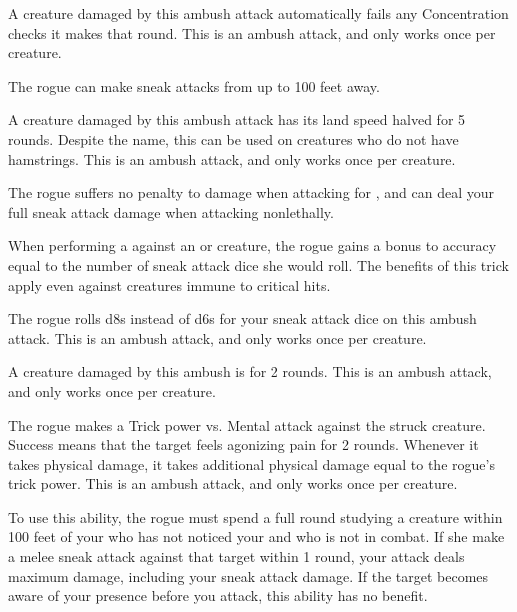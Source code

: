        A creature damaged by this ambush attack automatically fails any Concentration checks it makes that round.
        This is an ambush attack, and only works once per creature.

        The rogue can make sneak attacks from up to 100 feet away.

        A creature damaged by this ambush attack has its land speed halved for 5 rounds.
        Despite the name, this can be used on creatures who do not have hamstrings.
        This is an ambush attack, and only works once per creature.

        The rogue suffers no penalty to damage when attacking for , and can deal your full sneak attack damage when attacking nonlethally.


        When performing a  against an  or \unaware creature, the rogue gains a bonus to accuracy equal to the number of sneak attack dice she would roll.
        The benefits of this trick apply even against creatures immune to critical hits.

        The rogue rolls d8s instead of d6s for your sneak attack dice on this ambush attack.
        This is an ambush attack, and only works once per creature.

        A creature damaged by this ambush is \immobilized for 2 rounds.
        This is an ambush attack, and only works once per creature.

        The rogue makes a Trick power vs. Mental attack against the struck creature.
        Success means that the target feels agonizing pain for 2 rounds.
        Whenever it takes physical damage, it takes additional physical damage equal to the rogue's trick power.
        This is an ambush attack, and only works once per creature.

        To use this ability, the rogue must spend a full round studying a creature within 100 feet of your who has not noticed your and who is not in combat.
        If she make a melee sneak attack against that target within 1 round, your attack deals maximum damage, including your sneak attack damage.
        If the target becomes aware of your presence before you attack, this ability has no benefit.

